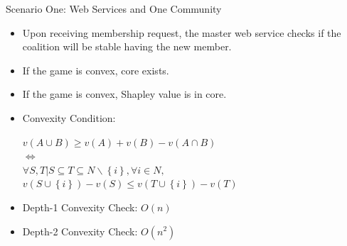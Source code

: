 \documentclass{beamer}
\begin{document}
\begin{frame}{Scenario One: Web Services and One Community}


    \begin{itemize}
        \item Upon receiving membership request, the master web service checks if the coalition will be stable having the new member.
        \item If the game is convex, core exists.
        \item If the game is convex, Shapley value is in core.
        \item Convexity Condition:
        \begin{center}
          $v(A \cup B) \geq v(A) + v(B) - v(A \cap B)$ \\
          $\Leftrightarrow$  \\
          $\forall S,T | S \subseteq T \subseteq N \backslash \left\{i\right\}, \forall i \in N,$ \\
          {\color{blue} $v(S \cup \left\{i\right\}) - v(S) \leq v (T \cup \left\{i\right\}) - v(T)$ }
        \end{center}
        \item Depth-1 Convexity Check: $O(n)$
        \item Depth-2 Convexity Check: $O(n^2)$
    \end{itemize}
       	
\end{frame}
\end{document}
